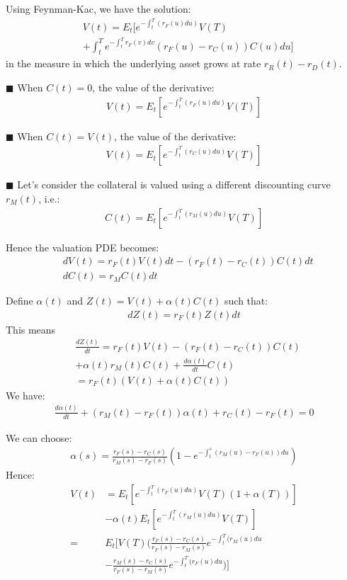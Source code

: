 \documentclass[twoside,twocolumn]{article}
\begin{document}
Using Feynman-Kac, we have the solution:
\begin{align*}
&V(t) = E_t [ e^{-\int_t^T(r_{F}(u) du)}V(T) \\
& + \int_t^T e^{-\int_t^T r_{F}(v)dv} (r_{F}(u) - r_{C}(u)) C(u) du ]
\end{align*}
in the measure in which the underlying asset grows at rate $r_{R}(t)-r_{D}(t)$.


$\blacksquare$ When $C(t) = 0$, the value of the derivative:
\begin{align*}
V(t) = E_t [ e^{-\int_t^T(r_{F}(u) du)}V(T)]
\end{align*}

$\blacksquare$ When $C(t) = V(t)$, the value of the derivative:
\begin{align*}
V(t) = E_t [ e^{-\int_t^T(r_{C}(u) du)}V(T)]
\end{align*}

$\blacksquare$ Let's consider the collateral is valued using a different discounting curve $r_{M}(t)$, i.e.:
\begin{align*}
C(t) = E_t [ e^{-\int_t^T(r_{M}(u) du)}V(T)]
\end{align*}

Hence the valuation PDE becomes:
\begin{align*}
&dV(t)=r_{F}(t)V(t)dt - (r_{F}(t)-r_{C}(t))C(t)dt \\
&dC(t)=r_{M}C(t)dt
\end{align*}

Define $\alpha(t)$ and $Z(t) = V(t)+\alpha(t)C(t)$ such that:
\begin{align*}
dZ(t) = r_{F}(t) Z(t) dt
\end{align*}
This means 
\begin{align*}
&\frac{dZ(t)}{dt} = r_{F}(t)V(t) - (r_{F}(t)-r_{C}(t))C(t) \\
&+ \alpha(t)r_{M}(t)C(t) +  \frac{d\alpha(t)}{dt}C(t) \\
&= r_{F}(t)(V(t)+\alpha(t)C(t))
\end{align*}
We have:
\begin{align*}
\frac{d\alpha(t)}{dt} + (r_{M}(t)-r_{F}(t)) \alpha(t) + r_{C}(t)-r_{F}(t) = 0
\end{align*}

We can choose:
\begin{align*}
\alpha(s) = \frac{r_{F}(s)-r_{C}(s)}{r_{M}(s)-r_{F}(s)}(1-e^{-\int_t^s (r_{M}(u)-r_{F}(u))du})
\end{align*}
Hence:
\begin{align*}
V(t)& = E_t[ e^{-\int_t^T(r_{F}(u) du)}V(T)(1+\alpha(T))] \\
&- \alpha(t)E_t [ e^{-\int_t^T(r_{M}(u) du)}V(T)] \\
=& E_t[V(T) ( \frac{r_{F}(s)-r_{C}(s)}{r_{F}(s)-r_{M}(s)} e^{-\int_t^T(r_{M}(u) du} \\
&- \frac{r_{M}(s)-r_{C}(s)}{r_{F}(s)-r_{M}(s)} e^{-\int_t^T(r_{F}(u) du})]
\end{align*}
\end{document}
